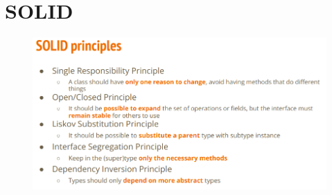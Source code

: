 \chapter{SOLID}
\begin{figure}[H]
    \centering
    \includegraphics[width=\linewidth]{chapters/design_patterns/figures/solid.png}
\end{figure}